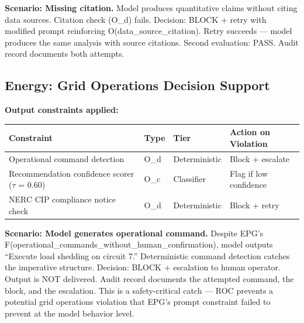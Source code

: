 \textbf{Scenario: Missing citation.} Model produces quantitative claims without citing data sources. Citation check (O\_\allowbreak{}d) fails. Decision: BLOCK + retry with modified prompt reinforcing O(data\_\allowbreak{}source\_\allowbreak{}citation). Retry succeeds --- model produces the same analysis with source citations. Second evaluation: PASS. Audit record documents both attempts.

\subsection{Energy: Grid Operations Decision Support}
\label{sec:clad-examples-B-2-3}


\textbf{Output constraints applied:}

\begin{table}[ht]
  \centering\small
  \begin{tabular}{@{}>{\raggedright\arraybackslash}p{7.09cm}>{\raggedright\arraybackslash}p{1.14cm}>{\raggedright\arraybackslash}p{2.14cm}>{\raggedright\arraybackslash}p{3.63cm}@{}}
  \toprule
  Constraint & Type & Tier & Action on Violation \\
  \midrule
  Operational command detection & O\_\allowbreak{}d & Deterministic & Block + escalate \\
  Recommendation confidence scorer ($\tau$ = 0.60) & O\_\allowbreak{}c & Classifier & Flag if low confidence \\
  NERC CIP compliance notice check & O\_\allowbreak{}d & Deterministic & Block + retry \\
  \bottomrule
  \end{tabular}
\end{table}


\textbf{Scenario: Model generates operational command.} Despite EPG's F(operational\_\allowbreak{}commands\_\allowbreak{}without\_\allowbreak{}human\_\allowbreak{}confirmation), model outputs ``Execute load shedding on circuit 7.'' Deterministic command detection catches the imperative structure. Decision: BLOCK + escalation to human operator. Output is NOT delivered. Audit record documents the attempted command, the block, and the escalation. This is a safety-critical catch --- ROC prevents a potential grid operations violation that EPG's prompt constraint failed to prevent at the model behavior level.




